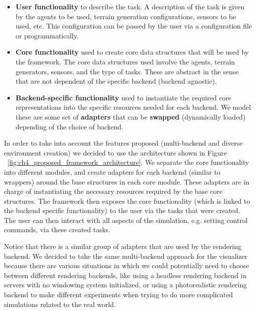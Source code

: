 \begin{itemize}
    \item \textbf{User functionality} to describe the task. A description of the task is given by 
          the agents to be used, terrain generation configurations, sensors to be used, etc. This configuration
          can be passed by the user via a configuration file or programmatically.
    \item \textbf{Core functionality} used to create core data structures that will be used by the framework.
          The core data structures used involve the agents, terrain generators, sensors, and the type of tasks. 
          These are abstract in the sense that are not dependent of the specific backend (backend agnostic).
    \item \textbf{Backend-specific functionality} used to instantiate the required core representations
          into the specific resources needed for each backend. We model these are some set of \textbf{adapters}
          that can be \textbf{swapped} (dynamically loaded) depending of the choice of backend.
\end{itemize}

\figFrameworkFlow

In order to take into account the features proposed (multi-backend and diverse environment
creation) we decided to use the architecture shown in Figure ~\ref{fig:ch4_proposed_framework_architecture}. 
We separate the core functionality into different modules, and create adapters for 
each backend (similar to wrappers) around the base structures in each core module. 
These adapters are in charge of instantiating the necessary resources required by the 
base core structures. The framework then exposes the core functionality (which is linked 
to the backend specific functionality) to the user via the tasks that were created. 
The user can then interact with all aspects of the simulation, e.g. setting control 
commands, via these created tasks.

Notice that there is a similar group of adapters that are used by the rendering backend. We
decided to take the same multi-backend approach for the visualizer because there are various situations
in which we could potentially need to choose between different rendering backends, like using a 
headless rendering backend in servers with no windowing system initialized, or using a photorealistic
rendering backend to make different experiments when trying to do more complicated simulations related to
the real world.


